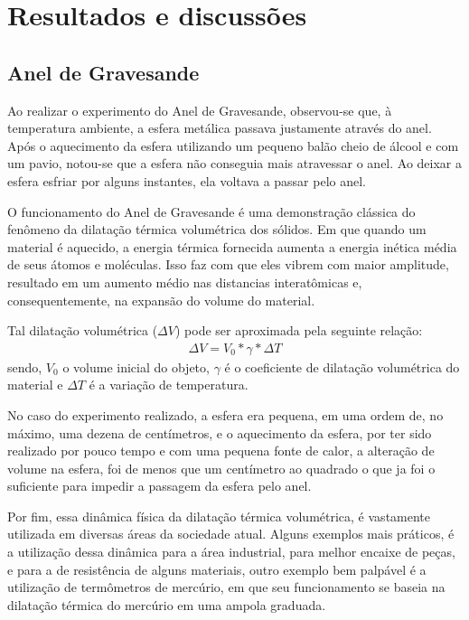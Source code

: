 \section{Resultados e discussões}

\subsection{Anel de Gravesande}
Ao realizar o experimento do Anel de Gravesande, observou-se que, à temperatura ambiente, a esfera metálica passava justamente através do anel. Após o aquecimento da esfera utilizando um pequeno balão cheio de álcool e com um pavio, notou-se que a esfera não conseguia mais atravessar o anel. Ao deixar a esfera esfriar por alguns instantes, ela voltava a passar pelo anel.

O funcionamento do Anel de Gravesande é uma demonstração clássica do fenômeno da dilatação térmica volumétrica dos sólidos. Em que quando um material é aquecido, a energia térmica fornecida aumenta a energia inética média de seus átomos e moléculas. Isso faz com que eles vibrem com maior amplitude, resultado em um aumento médio nas distancias interatômicas e, consequentemente, na expansão do volume do material.

Tal dilatação volumétrica (\(\Delta V\)) pode ser aproximada pela seguinte relação:
\begin{align*}
	\Delta V = V_0 * \gamma * \Delta T
\end{align*}
sendo, \(V_0\) o volume inicial do objeto, \(\gamma\) é o coeficiente de dilatação volumétrica do material e \(\Delta T\) é a variação de temperatura.

No caso do experimento realizado, a esfera era pequena, em uma ordem de, no máximo, uma dezena de centímetros, e o aquecimento da esfera, por ter sido realizado por pouco tempo e com uma pequena fonte de calor, a alteração de volume na esfera, foi de menos que um centímetro ao quadrado o que ja foi o suficiente para impedir a passagem da esfera pelo anel.

Por fim, essa dinâmica física da dilatação térmica  volumétrica, é vastamente utilizada em diversas áreas da sociedade atual. Alguns exemplos mais práticos, é a utilização dessa dinâmica para a área industrial, para melhor encaixe de peças, e para a de resistência de alguns materiais, outro exemplo bem palpável é a utilização de termômetros de mercúrio, em que seu funcionamento se baseia na dilatação térmica do mercúrio em uma ampola graduada.  

